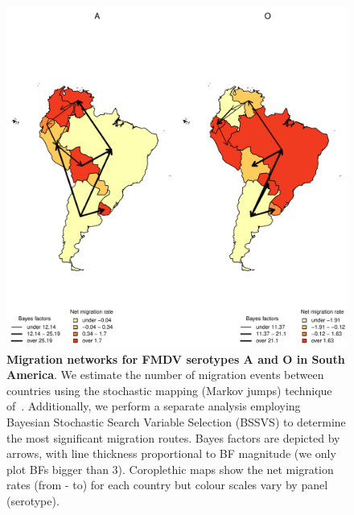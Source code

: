 \documentclass[10pt]{article}
\begin{document}
\begin{figure}[!ht]
\begin{center}
\includegraphics[scale=0.87]{FIGURES/PLOTS/MJandBFs.pdf}
\end{center}
\caption{\textbf{Migration networks for FMDV serotypes A and O in South America}.
We estimate the number of migration events between countries using the stochastic mapping (Markov jumps) technique of~\cite{Minin2008b}.
Additionally, we perform a separate analysis employing Bayesian Stochastic Search Variable Selection (BSSVS) to determine the most significant migration routes.
Bayes factors are depicted by arrows, with line thickness proportional to BF magnitude (we only plot BFs bigger than $3$).
Coroplethic maps show the net migration rates (from - to) for each country but colour scales vary by panel (serotype).
}
\label{fig:mj&BFs}
\end{figure}
\end{document}
